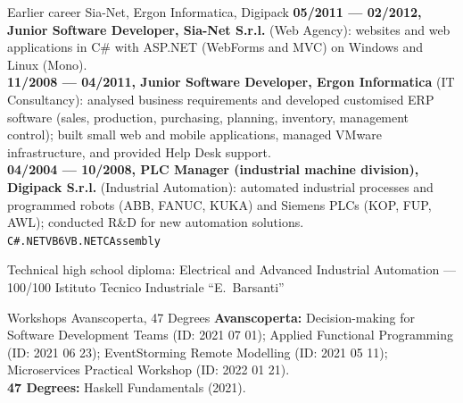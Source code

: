 \documentclass[9pt]{developercv}
\begin{document}
\begin{entrylist}
        {Earlier career}
        {Sia-Net, Ergon Informatica, Digipack}
        {\textbf{05/2011 --- 02/2012, Junior Software Developer, Sia-Net S.r.l.} (Web Agency): websites and web applications in C\# with ASP.NET (WebForms and MVC) on Windows and Linux (Mono).\\
       \textbf{11/2008 --- 04/2011, Junior Software Developer, Ergon Informatica} (IT Consultancy): analysed business requirements and developed customised ERP software (sales, production, purchasing, planning, inventory, management control); built small web and mobile applications, managed VMware infrastructure, and provided Help Desk support.\\
       \textbf{04/2004 --- 10/2008, PLC Manager (industrial machine division), Digipack S.r.l.} (Industrial Automation): automated industrial processes and programmed robots (ABB, FANUC, KUKA) and Siemens PLCs (KOP, FUP, AWL); conducted R\&D for new automation solutions.\\
       \texttt{C\#}\slashsep\texttt{.NET}\slashsep\texttt{VB6}\slashsep\texttt{VB.NET}\slashsep\texttt{C}\slashsep\texttt{Assembly}}

\end{entrylist}



\begin{entrylist}
        {Technical high school diploma: Electrical and Advanced Industrial Automation --- 100/100}
        {Istituto Tecnico Industriale ``E.\ Barsanti''}
        {}
\end{entrylist}



\begin{entrylist}

        {Workshops}
        {Avanscoperta, 47 Degrees}
        {\textbf{Avanscoperta:} Decision-making for Software Development Teams (ID\@: 2021 07 01); Applied Functional Programming (ID\@: 2021 06 23); EventStorming Remote Modelling (ID\@: 2021 05 11); Microservices Practical Workshop (ID\@: 2022 01 21).\\
       \textbf{47 Degrees:} Haskell Fundamentals (2021).}
\end{entrylist}
\end{document}
